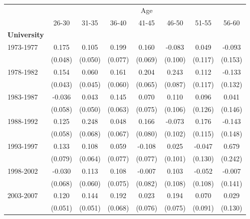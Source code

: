 {\def\sym#1{\ifmmode^{#1}\else\(^{#1}\)\fi} \begin{tabular}{l*{7}{c}} \toprule  &\multicolumn{7}{c}{Age}\\ \cmidrule{2-8}
               &\multicolumn{1}{c}{26-30}&\multicolumn{1}{c}{31-35}&\multicolumn{1}{c}{36-40}&\multicolumn{1}{c}{41-45}&\multicolumn{1}{c}{46-50}&\multicolumn{1}{c}{51-55}&\multicolumn{1}{c}{56-60}\\
\midrule \textbf{University}\\
1973-1977      &          0.175&          0.105&          0.199&          0.160&         -0.083&          0.049&         -0.093\\
               &        (0.048)&        (0.050)&        (0.077)&        (0.069)&        (0.100)&        (0.117)&        (0.153)\\
1978-1982           &       0.154&       0.060&       0.161&       0.204&       0.243&       0.112&      -0.133\\
                    &     (0.043)&     (0.045)&     (0.060)&     (0.065)&     (0.087)&     (0.117)&     (0.132)\\
1983-1987           &      -0.036&       0.043&       0.145&       0.070&       0.110&       0.096&       0.041\\
                    &     (0.058)&     (0.050)&     (0.063)&     (0.075)&     (0.106)&     (0.126)&     (0.146)\\
1988-1992           &       0.125&       0.248&       0.048&       0.166&      -0.073&       0.176&      -0.143\\
                    &     (0.058)&     (0.068)&     (0.067)&     (0.080)&     (0.102)&     (0.115)&     (0.148)\\
1993-1997           &       0.133&       0.108&       0.059&      -0.108&       0.025&      -0.047&       0.679\\
                    &     (0.079)&     (0.064)&     (0.077)&     (0.077)&     (0.101)&     (0.130)&     (0.242)\\
1998-2002           &      -0.030&       0.113&       0.108&      -0.007&       0.103&      -0.052&      -0.007\\
                    &     (0.068)&     (0.060)&     (0.075)&     (0.082)&     (0.108)&     (0.108)&     (0.141)\\
2003-2007           &       0.120&       0.144&       0.192&       0.023&       0.194&       0.070&       0.029\\
                    &     (0.051)&     (0.051)&     (0.068)&     (0.076)&     (0.075)&     (0.091)&     (0.130)\\

\end{tabular}}
